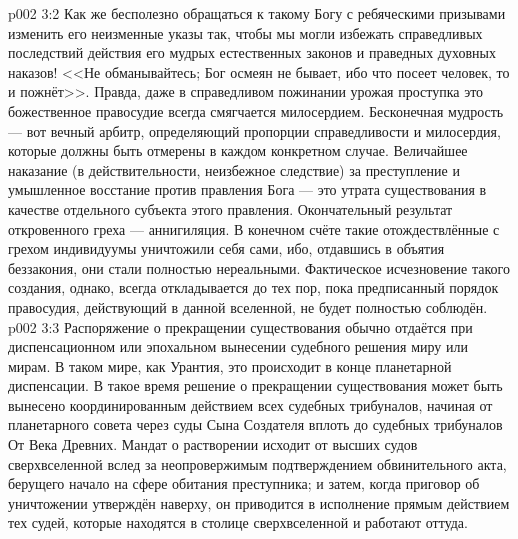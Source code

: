 \vs p002 3:2 \pc Как же бесполезно обращаться к такому Богу с ребяческими призывами изменить его неизменные указы так, чтобы мы могли избежать справедливых последствий действия его мудрых естественных законов и праведных духовных наказов! <<Не обманывайтесь; Бог осмеян не бывает, ибо что посеет человек, то и пожнёт>>. Правда, даже в справедливом пожинании урожая проступка это божественное правосудие всегда смягчается милосердием. Бесконечная мудрость --- вот вечный арбитр, определяющий пропорции справедливости и милосердия, которые должны быть отмерены в каждом конкретном случае. Величайшее наказание (в действительности, неизбежное следствие) за преступление и умышленное восстание против правления Бога --- это утрата существования в качестве отдельного субъекта этого правления. Окончательный результат откровенного греха --- аннигиляция. В конечном счёте такие отождествлённые с грехом индивидуумы уничтожили себя сами, ибо, отдавшись в объятия беззакония, они стали полностью нереальными. Фактическое исчезновение такого создания, однако, всегда откладывается до тех пор, пока предписанный порядок правосудия, действующий в данной вселенной, не будет полностью соблюдён.
\vs p002 3:3 Распоряжение о прекращении существования обычно отдаётся при диспенсационном или эпохальном вынесении судебного решения миру или мирам. В таком мире, как Урантия, это происходит в конце планетарной диспенсации. В такое время решение о прекращении существования может быть вынесено координированным действием всех судебных трибуналов, начиная от планетарного совета через суды Сына Создателя вплоть до судебных трибуналов От Века Древних. Мандат о растворении исходит от высших судов сверхвселенной вслед за неопровержимым подтверждением обвинительного акта, берущего начало на сфере обитания преступника; и затем, когда приговор об уничтожении утверждён наверху, он приводится в исполнение прямым действием тех судей, которые находятся в столице сверхвселенной и работают оттуда.
